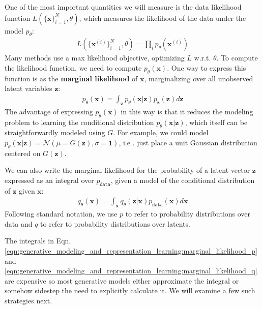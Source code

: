 One of the most important quantities we will measure is the data likelihood function $L(\{\mathbf{x}\}_{i=1}^N, \theta)$, which measures the likelihood of the data under the model $p_{\theta}$:
\begin{align}
    L(\{\mathbf{x}^{(i)}\}_{i=1}^N, \theta) = \prod_i p_{\theta}(\mathbf{x}^{(i)})
\end{align}
Many methods use a max likelihood objective, optimizing $L$ w.r.t. $\theta$. To compute the likelihood function, we need to compute $p_{\theta}(\mathbf{x})$. One way to express this function is as the \textbf{marginal likelihood} of $\mathbf{x}$, marginalizing over all unobserved latent variables $\mathbf{z}$:
\begin{align}
    p_{\theta}(\mathbf{x}) = \int_{\mathbf{z}} p_{\theta}(\mathbf{x} | \mathbf{z})p_{\mathbf{z}}(\mathbf{z})d\mathbf{z}\label{eqn:generative_modeling_and_representation_learning:marginal_likelihood_p}
\end{align}
The advantage of expressing $p_{\theta}(\mathbf{x})$ in this way is that it reduces the modeling problem to learning the conditional distribution $p_{\theta}(\mathbf{x} | \mathbf{z})$, which itself can be straightforwardly modeled using $G$. For example, we could model $p_{\theta}(\mathbf{x} | \mathbf{z}) = \mathcal{N}(\mu = G(\mathbf{z}), \sigma = \mathbf{1})$, i.e . just place a unit Gaussian distribution centered on $G(\mathbf{z})$.

We can also write the marginal likelihood for the probability of a latent vector $\mathbf{z}$ expressed as an integral over $p_{\texttt{data}}$, given a model of the conditional distribution of $\mathbf{z}$ given $\mathbf{x}$:
\begin{align}
    q_{\theta}(\mathbf{x}) = \int_{\mathbf{x}} q_{\theta}(\mathbf{z} | \mathbf{x})p_{\texttt{data}}(\mathbf{x})d\mathbf{x}\label{eqn:generative_modeling_and_representation_learning:marginal_likelihood_q}
\end{align}
Following standard notation, we use $p$ to refer to probability distributions over data and $q$ to refer to probability distributions over latents.

The integrals in Eqn. \ref{eqn:generative_modeling_and_representation_learning:marginal_likelihood_p} and \ref{eqn:generative_modeling_and_representation_learning:marginal_likelihood_q} are expensive so most generative models either approximate the integral or somehow sidestep the need to explicitly calculate it. We will examine a few such strategies next.

